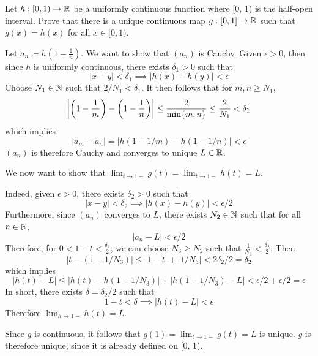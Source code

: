 \documentclass[a4paper, 12pt]{article}
\begin{document}
\begin{problem} 
Let $h: [0, 1) \to \bbr$ be a uniformly continuous function where [0, 1) is the half-open interval. Prove that there is a unique continuous map $g: [0, 1] \to \bbr$ such that $g(x) = h(x)$ for all $x \in [0, 1)$.
\end{problem}
\begin{solution}
    Let $a_n \coloneqq h\left(1-\frac{1}{n}\right)$. We want to show that $(a_n)$ is Cauchy. Given $\epsilon > 0$, then since $h$ is uniformly continuous, there exists $\delta_1 > 0$ such that \[
        |x-y| < \delta_1 \implies |h(x) - h(y)| < \epsilon
    \]
    Choose $N_1 \in \bbn$ such that $2/N_1 < \delta_1$. It then follows that for $m, n \geq N_1$, \[
        \abs*{\left(1-\frac{1}{m}\right) - \left(1 - \frac{1}{n}\right)} \leq \frac{2}{\min\{m, n\}} \leq \frac{2}{N_1} < \delta_1
    \]
    which implies \[
        |a_m - a_n| = |h(1 - 1/m) - h(1-1/n)| < \epsilon
    \]
    $(a_n)$ is therefore Cauchy and converges to unique $L \in \bbr$.

    We now want to show that $\lim_{t \to 1-} g(t) = \lim_{t \to 1-} h(t) = L$.

    Indeed, given $\epsilon > 0$, there exists $\delta_2 > 0$ such that \[
        |x - y| < \delta_2 \implies |h(x) - h(y)| < \epsilon / 2
    \]
    Furthermore, since $(a_n)$ converges to $L$, there exists $N_2 \in \bbn$ such that for all $n \in \bbn$, \[
        |a_n - L| < \epsilon/2
    \]
    Therefore, for $0 < 1 - t < \frac{\delta_2}{2}$, we can choose $N_3 \geq N_2$ such that $\frac{1}{N_3} < \frac{\delta_2}{2}$. Then
    \[
        |t - (1-1/N_3)| \leq |1-t| + |1/N_3| < 2\delta_2/2 = \delta_2
    \]
    which implies
    \[
        |h(t) - L| \leq |h(t) - h(1-1/N_3)| + |h(1-1/N_3) - L| < \epsilon/2 + \epsilon/2 = \epsilon
    \]
    In short, there exists $\delta = \delta_2/2$ such that \[
        1 - t < \delta \implies |h(t) - L| < \epsilon
    \]
    Therefore $\lim_{h \to 1-} h(t) = L$.

    Since $g$ is continuous, it follows that $g(1) = \lim_{t \to 1-}g(t) = L$ is unique. $g$ is therefore unique, since it is already defined on [0, 1).
\end{solution}
\end{document}
